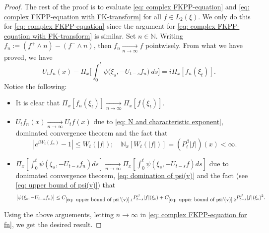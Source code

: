 \documentclass[12pt,oneside,english]{amsart}
\theoremstyle{plain}
\theoremstyle{definition}
\numberwithin{equation}{section}
\begin{document}
\begin{proof}
    The rest of the proof is to evaluate \eqref{eq: complex FKPP-equation} and \eqref{eq: complex FKPP-equation with FK-transform} for all $f\in L_2(\xi)$. We only do this for \eqref{eq: complex FKPP-equation} since the argument for \eqref{eq: complex FKPP-equation with FK-transform} is similar.
    Set $n \in \mathbb N$.
    Writing $f_n := (f^+ \wedge n) - (f^- \wedge n)$, then $f_n \xrightarrow[n\to \infty]{} f$ pointwisely.
    From what we have proved, we have
\begin{equation}
\label{eq: complex FKPP-equation for fn}
    U_tf_n(x) - \Pi_{x} \Big[\int_0^t \psi\big(\xi_s, - U_{t-s}f_n\big) ~ds\Big]
    = i \Pi_{x} [f_n(\xi_t)].
\end{equation}
    Notice the following:
\begin{itemize}
\item
    It is clear that $\Pi_{x}[f_n(\xi_t)] \xrightarrow[n\to \infty]{} \Pi_{x}[f(\xi_t)]$.
\item
     $U_tf_n(x) \xrightarrow[n\to \infty]{} U_tf(x)$ due to \eqref{eq: N and characteristic exponent}, dominated convergence theorem and the fact that
\[
    |e^{i W_t(f_n)} - 1| \leq W_t(|f|);
    \quad \mathbb N_x[W_t(|f|)] = (P_t^\beta |f|)(x) < \infty.
\]
\item
     $\Pi_{x} [\int_0^t \psi(\xi_s,- U_{t-s}f_n)ds] \xrightarrow[n\to \infty]{} \Pi_{x} [\int_0^t \psi(\xi_s,- U_{t-s}f)ds]$ due to donimated convergence theorem, \eqref{eq: domination of psi(v)} and the fact (see \eqref{eq: upper bound of psi(v)}) that
\begin{align}
    \big|\psi(\xi_s,- U_{t-s}f_n)\big|
    \leq C_{\ref{eq: upper bound of psi'(v)}.1} P_{t-s}^\beta|f|(\xi_s)+C_{\ref{eq: upper bound of psi'(v)}.2} P_{t-s}^\beta|f|(\xi_s)^2.
\end{align}
\end{itemize}
    Using the above arguements, letting $n \to \infty$ in \eqref{eq: complex FKPP-equation for fn}, we get the desired result.
\end{proof}
\end{document}
